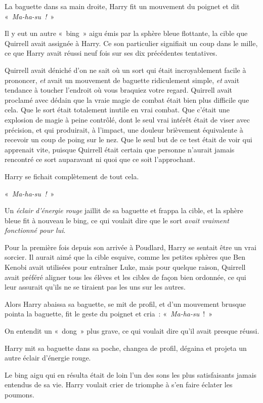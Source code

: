 \later

La baguette dans sa main droite, Harry fit un mouvement du poignet et dit «~\emph{Ma-ha-su~!}~»

Il y eut un autre «~bing~» aigu émis par la sphère bleue flottante, la cible que Quirrell avait assignée à Harry.
Ce son particulier signifiait un coup dans le mille, ce que Harry avait réussi neuf fois sur ses dix précédentes tentatives.

Quirrell avait déniché d'on ne sait où un sort qui était incroyablement facile à prononcer, \emph{et} avait un mouvement de baguette ridiculement simple, \emph{et} avait tendance à toucher l'endroit où vous braquiez votre regard.
Quirrell avait proclamé avec dédain que la vraie magie de combat était bien plus difficile que cela.
Que le sort était totalement inutile en vrai combat.
Que c'était une explosion de magie à peine contrôlé, dont le seul vrai intérêt était de viser avec précision, et qui produirait, à l'impact, une douleur brièvement équivalente à recevoir un coup de poing sur le nez.
Que le seul but de ce test était de voir qui apprenait vite, puisque Quirrell était certain que personne n'aurait jamais rencontré ce sort auparavant ni quoi que ce soit l'approchant.

Harry se fichait complètement de tout cela.

«~\emph{Ma-ha-su~!}~»

Un \emph{éclair d'énergie rouge} jaillit de sa baguette et frappa la cible, et la sphère bleue fit à nouveau le bing, ce qui voulait dire que le sort \emph{avait vraiment fonctionné pour lui}.

Pour la première fois depuis son arrivée à Poudlard, Harry se sentait être un vrai sorcier.
Il aurait aimé que la cible esquive, comme les petites sphères que Ben Kenobi avait utilisées pour entraîner Luke, mais pour quelque raison, Quirrell avait préféré aligner tous les élèves et les cibles de façon bien ordonnée, ce qui leur assurait qu'ils ne se tiraient pas les uns sur les autres.

Alors Harry abaissa sa baguette, se mit de profil, et d'un mouvement brusque pointa la baguette, fit le geste du poignet et cria~: «~\emph{Ma-ha-su}~!~»

On entendit un «~dong~» plus grave, ce qui voulait dire qu'il avait presque réussi.

Harry mit sa baguette dans sa poche, changea de profil, dégaina et projeta un autre éclair d'énergie rouge.

Le bing aigu qui en résulta était de loin l'un des sons les plus satisfaisants jamais entendus de sa vie.
Harry voulait crier de triomphe à s'en faire éclater les poumons.

